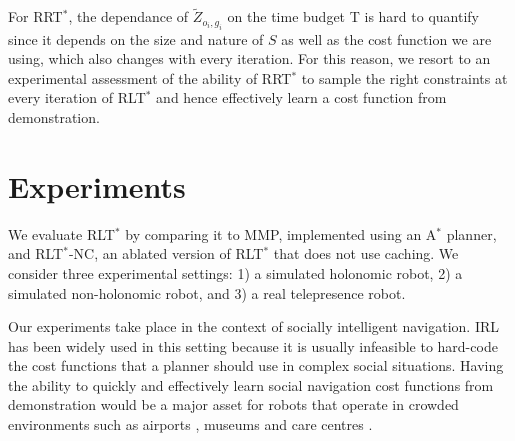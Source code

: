 \documentclass[letterpaper, 10 pt, conference]{ieeeconf}
\begin{document}



For RRT$^*$, the dependance of $\tilde{Z}_{o_i,g_i}$ on the time budget T is hard to quantify since it depends on the size and nature of $S$ as well as the cost function we are using, which also changes with every iteration. For this reason, we resort to an experimental assessment of the ability of RRT$^*$ to sample the right constraints at every iteration of RLT$^*$ and hence effectively learn a cost function from demonstration.

\section{Experiments}

We evaluate RLT$^*$ by comparing it to MMP, implemented using an A$^*$ planner, and RLT$^*$-NC, an ablated version of RLT$^*$ that does not use caching.  We consider three experimental settings: 1) a simulated holonomic robot, 2) a simulated non-holonomic robot, and 3) a real telepresence robot.
	
	Our experiments take place in the context of socially intelligent navigation. IRL has been widely used in this setting \cite{okallearning,henry2010learning,vasquez2014inverse} because it is usually infeasible to hard-code the cost functions that a planner should use in complex social situations. Having the ability to quickly and effectively learn social navigation cost functions from demonstration would be a major asset for robots that operate in crowded environments such as airports \cite{triebel2015spencer}, museums \cite{thrun1999minerva} and care centres \cite{shiarlis2015teresa}.
	
\end{document}
